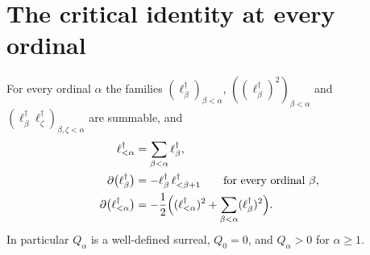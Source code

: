 \documentclass[11pt,letterpaper]{article}
\numberwithin{equation}{section}
\theoremstyle{definition}
\theoremstyle{remark}
\newcommand{\der}{\partial}
\begin{document}
\section{The critical identity at every ordinal}
\label{diff:cp:sec:support}

\begin{lemma}
\label{diff:cp:lem:triangular}
For every ordinal $\alpha$ the families $(\ell_{\beta}^{\dagger})_{\beta<\alpha}$,
$((\ell_{\beta}^{\dagger})^{2})_{\beta<\alpha}$ and
$(\ell_{\beta}^{\dagger}\ell_{\zeta}^{\dagger})_{\beta,\zeta<\alpha}$ are summable,
and
\begin{align}
 \ell_{<\alpha}^{\dagger}&=\sum_{\beta<\alpha}\ell_{\beta}^{\dagger},
 \label{diff:cp:eq:Adef}\\
 \der\bigl(\ell_{\beta}^{\dagger}\bigr)&=-\ell_{\beta}^{\dagger}\,\ell_{<\beta+1}^{\dagger}
 \qquad\text{for every ordinal }\beta,\label{diff:cp:eq:ader}\\
 \der\bigl(\ell_{<\alpha}^{\dagger}\bigr)&=-\frac12\Bigl((\ell_{<\alpha}^{\dagger})^{2}
 +\sum_{\beta<\alpha}(\ell_{\beta}^{\dagger})^{2}\Bigr).\label{diff:cp:eq:Ader}
\end{align}
In particular $Q_{\alpha}$ is a well-defined surreal, $Q_{0}=0$, and
$Q_{\alpha}>0$ for $\alpha\geq1$.
\end{lemma}
\end{document}
